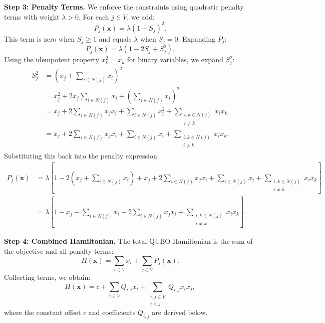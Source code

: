 \documentclass[12pt]{article}
\begin{document}
\textbf{Step 3: Penalty Terms.}
We enforce the constraints using quadratic penalty terms with weight $\lambda > 0$. For each $j \in V$, we add:
\begin{equation}
P_j(\mathbf{x}) = \lambda \left( 1 - S_j \right)^2.
\end{equation}
This term is zero when $S_j \ge 1$ and equals $\lambda$ when $S_j = 0$. Expanding $P_j$:
\begin{equation}
P_j(\mathbf{x}) = \lambda \left( 1 - 2S_j + S_j^2 \right).
\end{equation}
Using the idempotent property $x_k^2 = x_k$ for binary variables, we expand $S_j^2$:
\begin{align}
S_j^2 &= \left( x_j + \sum_{i \in N(j)} x_i \right)^2 \\
&= x_j^2 + 2x_j \sum_{i \in N(j)} x_i + \left( \sum_{i \in N(j)} x_i \right)^2 \\
&= x_j + 2\sum_{i \in N(j)} x_j x_i + \sum_{i \in N(j)} x_i^2 + \sum_{\substack{i, k \in N(j) \\ i \neq k}} x_i x_k \\
&= x_j + 2\sum_{i \in N(j)} x_j x_i + \sum_{i \in N(j)} x_i + \sum_{\substack{i, k \in N(j) \\ i \neq k}} x_i x_k.
\end{align}
Substituting this back into the penalty expression:
\begin{align}
P_j(\mathbf{x}) &= \lambda \left[ 1 - 2\left( x_j + \sum_{i \in N(j)} x_i \right) + x_j + 2\sum_{i \in N(j)} x_j x_i + \sum_{i \in N(j)} x_i + \sum_{\substack{i, k \in N(j) \\ i \neq k}} x_i x_k \right] \\
&= \lambda \left[ 1 - x_j - \sum_{i \in N(j)} x_i + 2\sum_{i \in N(j)} x_j x_i + \sum_{\substack{i, k \in N(j) \\ i \neq k}} x_i x_k \right].
\end{align}

\textbf{Step 4: Combined Hamiltonian.}
The total QUBO Hamiltonian is the sum of the objective and all penalty terms:
\begin{equation}
H(\mathbf{x}) = \sum_{i \in V} x_i + \sum_{j \in V} P_j(\mathbf{x}).
\end{equation}
Collecting terms, we obtain:
\begin{equation}
H(\mathbf{x}) = c + \sum_{i \in V} Q_{i,i} x_i + \sum_{\substack{i, j \in V \\ i < j}} Q_{i,j} x_i x_j,
\end{equation}
where the constant offset $c$ and coefficients $Q_{i,j}$ are derived below.
\end{document}
